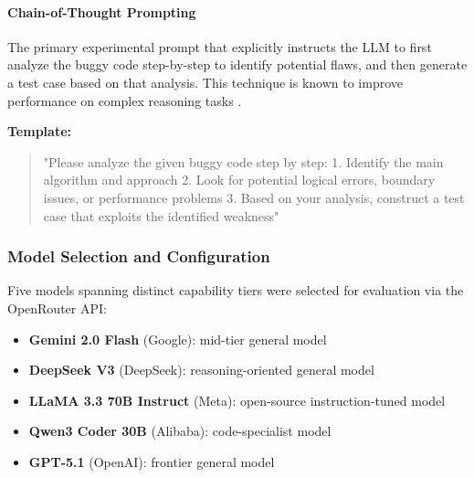 \paragraph{Chain-of-Thought Prompting}

The primary experimental prompt that explicitly instructs the LLM to first analyze the buggy code step-by-step to identify potential flaws, and then generate a test case based on that analysis. This technique is known to improve performance on complex reasoning tasks \cite{wei2022chain, li2025uncertainty}.

\textbf{Template:}
\begin{quote}
"Please analyze the given buggy code step by step:
1. Identify the main algorithm and approach
2. Look for potential logical errors, boundary issues, or performance problems
3. Based on your analysis, construct a test case that exploits the identified weakness"
\end{quote}

\begin{table}[h!]
\centering
\caption{Comparison of the three prompting strategies used in AlgoBugs.}
\label{tab:prompt_strategies}
\renewcommand{\arraystretch}{1.3}
\end{table}

\subsubsection{Model Selection and Configuration}

Five models spanning distinct capability tiers were selected for evaluation via the OpenRouter API:

\begin{itemize}
    \item \textbf{Gemini 2.0 Flash} (Google): mid-tier general model
    \item \textbf{DeepSeek V3} (DeepSeek): reasoning-oriented general model
    \item \textbf{LLaMA 3.3 70B Instruct} (Meta): open-source instruction-tuned model
    \item \textbf{Qwen3 Coder 30B} (Alibaba): code-specialist model
    \item \textbf{GPT-5.1} (OpenAI): frontier general model
\end{itemize}

